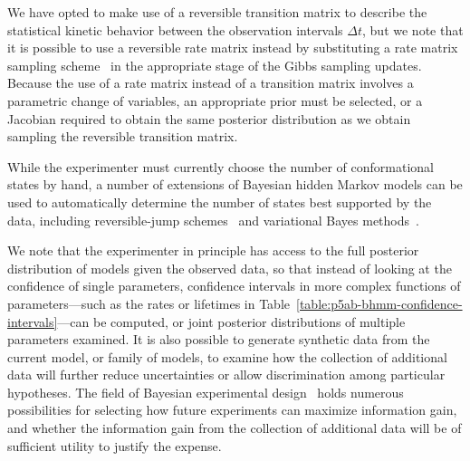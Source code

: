 \documentclass[aps,pre,twocolumn,superscriptaddress,nofootinbib,longbibliography]{revtex4-1}
\begin{document}
{We have opted to make use of a reversible transition matrix to describe the statistical kinetic behavior between the observation intervals $\Delta t$, but we note that it is possible to use a reversible rate matrix instead by substituting a rate matrix sampling scheme~\cite{hummer:njp:2005:rate-matrix-sampling} in the appropriate stage of the Gibbs sampling updates.
\color{red}
Because the use of a rate matrix instead of a transition matrix involves a parametric change of variables, an appropriate prior must be selected, or a Jacobian required to obtain the same posterior distribution as we obtain sampling the reversible transition matrix.
\color{black}

While the experimenter must currently choose the number of conformational states by hand, a number of extensions of Bayesian hidden Markov models can be used to automatically determine the number of states best supported by the data, including reversible-jump schemes~\cite{robert:j-r-statist-soc-b:2000:reversible-jump-mcmc,degunst-schouten:bernoulli:2003:reversible-jump-hmm} and variational Bayes methods~\cite{beal:variational-bayes,bronson:biophys-j:2009:variational-bayesian-hmm}.

We note that the experimenter in principle has access to the full posterior distribution of models given the observed data, so that instead of looking at the confidence of single parameters, confidence intervals in more complex functions of parameters---such as the rates or lifetimes in Table~\ref{table:p5ab-bhmm-confidence-intervals}---can be computed, or joint posterior distributions of multiple parameters examined.
It is also possible to generate synthetic data from the current model, or family of models, to examine how the collection of additional data will further reduce uncertainties or allow discrimination among particular hypotheses.
The field of Bayesian experimental design~\cite{chaloner:stat-sci:1995:bayesian-experimental-design-review} holds numerous possibilities for selecting how future experiments can maximize information gain, and whether the information gain from the collection of additional data will be of sufficient utility to justify the expense.


}
\end{document}
